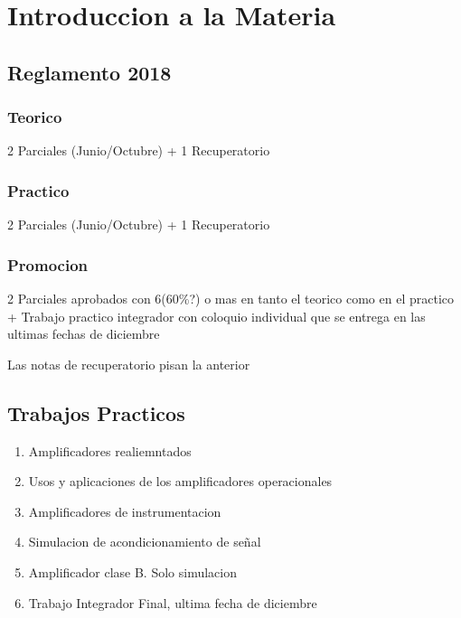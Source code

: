 \chapter*{Introduccion a la Materia}

\section*{Reglamento 2018}
\subsection*{Teorico}
2 Parciales (Junio/Octubre) + 1 Recuperatorio

\subsection*{Practico}
2 Parciales (Junio/Octubre) + 1 Recuperatorio

\subsection*{Promocion}
2 Parciales aprobados con 6(60\%?) o mas en tanto el teorico como en el 
practico + Trabajo practico integrador con coloquio individual 
que se entrega en las ultimas fechas de diciembre

Las notas de recuperatorio pisan la anterior

\section*{Trabajos Practicos}
\begin{enumerate}
	\item Amplificadores realiemntados
	\item Usos y aplicaciones de los amplificadores operacionales
	\item Amplificadores de instrumentacion
	\item Simulacion de acondicionamiento de señal
	\item Amplificador clase B. Solo simulacion
	\item Trabajo Integrador Final, ultima fecha de diciembre
\end{enumerate}
